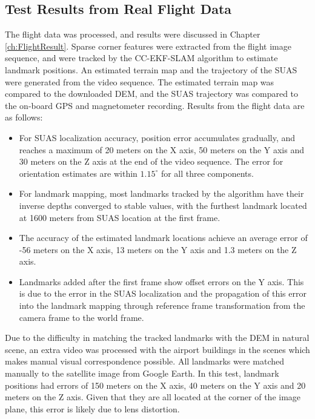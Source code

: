 \subsection{Test Results from Real Flight Data}
The flight data was processed, and results were discussed in Chapter
\ref{ch:FlightResult}. Sparse corner features were extracted from the
flight image sequence, and were tracked by the CC-EKF-SLAM algorithm
to estimate landmark positions. An estimated terrain map and the
trajectory of the SUAS were generated from the video sequence. The
estimated terrain map was compared to the downloaded DEM, and the SUAS
trajectory was compared to the on-board GPS and magnetometer
recording. Results from the flight data are as follows:
\begin{itemize}
  \item For SUAS localization accuracy, position error accumulates
  gradually, and reaches a maximum of 20 meters on the X axis, 50 meters
  on the Y axis and 30 meters on the Z axis at the end of the video sequence.
  The error for orientation estimates are within $1.15^\circ$ for all
  three components.
  \item For landmark mapping, most landmarks tracked by the
  algorithm have their inverse depths converged to stable values, with the
  furthest landmark located at 1600 meters from SUAS location at the
  first frame.
  \item The accuracy of the estimated landmark locations achieve an
  average error of -56 meters on the X axis, 13 meters on the Y axis
  and 1.3 meters on the Z axis.
  \item Landmarks added after the first frame show offset errors on
  the Y axis. This is due to the error in the SUAS localization and
  the propagation of this error into the landmark mapping through
  reference frame transformation from the camera frame to the world
  frame.
\end{itemize}

Due to the difficulty in matching the tracked landmarks with the DEM
in natural scene, an extra video was processed with the airport
buildings in the scenes which makes manual visual correspondence
possible. All landmarks were matched manually to the satellite image
from Google Earth. In this test, landmark positions had errors of 150
meters on the X axis, 40 meters on the Y axis and 20 meters on the Z
axis. Given that they are all located at the corner of the image
plane, this error is likely due to lens distortion.


